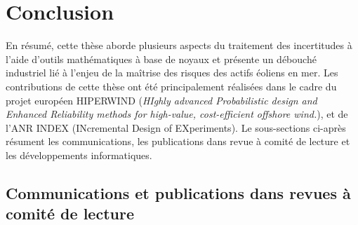 \section{Conclusion}

En résumé, cette thèse aborde plusieurs aspects du traitement des incertitudes à l'aide d'outils mathématiques à base de noyaux et présente un débouché industriel lié à l'enjeu de la maîtrise des risques des actifs éoliens en mer. Les contributions de cette thèse ont été principalement réalisées dans le cadre du projet européen HIPERWIND (\textit{HIghly advanced Probabilistic design and Enhanced Reliability methods for high-value, cost-efficient offshore wind.}), et de l'ANR INDEX (INcremental Design of EXperiments). Le sous-sections ci-après résument les communications, les publications dans revue à comité de lecture et les développements informatiques.

\subsection{Communications et publications dans revues à comité de lecture}

